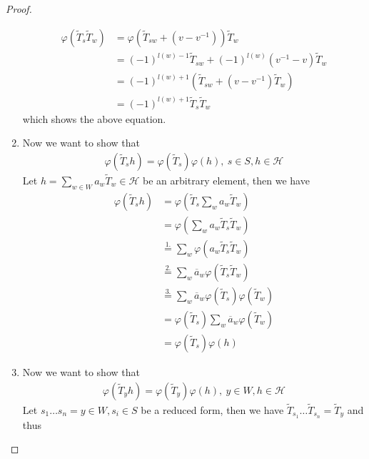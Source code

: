 \documentclass[]{article}
\begin{document}
\begin{proof}
\begin{enumerate}
        \begin{align*}
            \varphi(\widetilde{T}_s \widetilde{T}_w) &= \varphi(\widetilde{T}_{sw}+(v-v^{-1}))\widetilde{T}_w \\
            &=(-1)^{l(w)-1} \widetilde{T}_{sw} + (-1)^{l(w)}(v^{-1}-v)\widetilde{T}_w \\
            &=(-1)^{l(w)+1} (\widetilde{T}_{sw} + (v- v^{-1}) \widetilde{T}_w) \\
            &=(-1)^{l(w)+1} \widetilde{T}_s \widetilde{T}_w
        \end{align*}
        which shows the above equation. 
        \item Now we want to show that
        \begin{align*}
            \varphi(\widetilde{T}_s h) = \varphi(\widetilde{T}_s) \varphi(h), \ s \in S, h \in \mathscr{H}
        \end{align*}
        Let \(h = \sum_{w \in W}^{}a_w \widetilde{T}_w \in \mathscr{H}\) be an arbitrary element, then we have 
        \begin{align*}
            \varphi(\widetilde{T}_s h) &= \varphi\left(\widetilde{T}_s \sum_{w}^{} a_w \widetilde{T}_w\right) \\
            &=\varphi\left( \sum_{w}^{} a_w \widetilde{T}_s\widetilde{T}_w\right) \\
            &\overset{1.}{=} \sum_{w}^{} \varphi(a_w \widetilde{T}_s\widetilde{T}_w) \\
            &\overset{2.}{=} \sum_{w}^{} \overline{a}_w \varphi(\widetilde{T}_s\widetilde{T}_w) \\
            &\overset{3.}{=} \sum_{w}^{} \overline{a}_w \varphi(\widetilde{T}_s)\varphi(\widetilde{T}_w) \\
            &=\varphi(\widetilde{T}_s) \sum_{w}^{} \overline{a}_w \varphi(\widetilde{T}_w) \\
            &= \varphi(\widetilde{T}_s) \varphi(h)
        \end{align*}
        \item Now we want to show that
        \begin{align*}
            \varphi(\widetilde{T}_y h) = \varphi(\widetilde{T}_y) \varphi(h), \ y \in W, h \in \mathscr{H}
        \end{align*}
        Let \(s_1 \dots s_n = y \in W, s_i \in S\) be a reduced form, then we have \(\widetilde{T}_{s_1}\dots \widetilde{T}_{s_n} = \widetilde{T}_y\) and thus
    \end{enumerate}
\end{proof}
\end{document}
